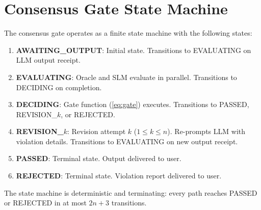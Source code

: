 \documentclass[11pt,a4paper]{article}
\begin{document}
\section{Consensus Gate State Machine}
\label{app:state-machine}

The consensus gate operates as a finite state machine with the
following states:

\begin{enumerate}
  \item \textbf{AWAITING\_OUTPUT}: Initial state.  Transitions to
        EVALUATING on LLM output receipt.
  \item \textbf{EVALUATING}: Oracle and SLM evaluate in parallel.
        Transitions to DECIDING on completion.
  \item \textbf{DECIDING}: Gate function (\cref{eq:gate}) executes.
        Transitions to PASSED, REVISION\_$k$, or REJECTED.
  \item \textbf{REVISION\_$k$}: Revision attempt $k$ ($1 \leq k \leq n$).
        Re-prompts LLM with violation details.  Transitions to
        EVALUATING on new output receipt.
  \item \textbf{PASSED}: Terminal state.  Output delivered to user.
  \item \textbf{REJECTED}: Terminal state.  Violation report
        delivered to user.
\end{enumerate}

The state machine is deterministic and terminating: every path
reaches PASSED or REJECTED in at most $2n + 3$ transitions.
\end{document}
